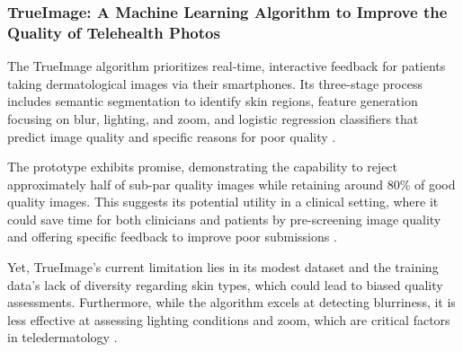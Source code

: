 \subsubsection{TrueImage: A Machine Learning Algorithm to Improve the Quality of Telehealth Photos}
\label{subsub:TrueImage}
The TrueImage algorithm prioritizes real-time, interactive feedback for patients taking dermatological images via their smartphones. Its three-stage process includes semantic segmentation to identify skin regions, feature generation focusing on blur, lighting, and zoom, and logistic regression classifiers that predict image quality and specific reasons for poor quality \autocite{TrueImage}. \par
\vspace{\baselineskip}
\noindent
The prototype exhibits promise, demonstrating the capability to reject approximately half of sub-par quality images while retaining around 80\% of good quality images. This suggests its potential utility in a clinical setting, where it could save time for both clinicians and patients by pre-screening image quality and offering specific feedback to improve poor submissions \autocite{TrueImage}.
\par
\vspace{\baselineskip}
\noindent
Yet, TrueImage’s current limitation lies in its modest dataset and the training data's lack of diversity regarding skin types, which could lead to biased quality assessments. Furthermore, while the algorithm excels at detecting blurriness, it is less effective at assessing lighting conditions and zoom, which are critical factors in teledermatology \autocite{TrueImage}.\par

